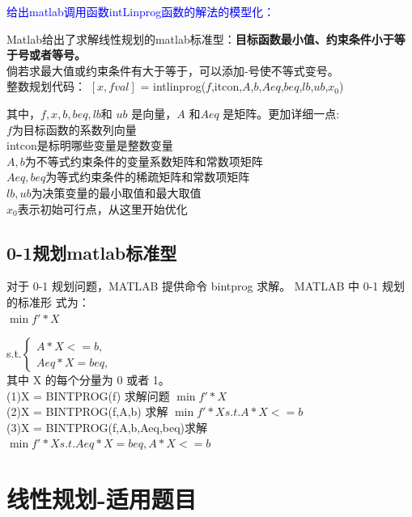 \documentclass[a4paper,20pt]{article}
\begin{document}
\par \noindent \large \textcolor{blue}{给出matlab调用函数intLinprog函数的解法的模型化：}
    \par Matlab给出了求解线性规划的matlab标准型：\textbf{目标函数最小值、约束条件小于等于号或者等号。}\\倘若求最大值或约束条件有大于等于，可以添加-号使不等式变号。
    \\ 整数规划代码： $\left[  x,fval  \right]$ = intlinprog($f$,itcon,$A$,$b$,$Aeq$,$beq$,$lb$,$ub$,$x_0$)
    \par 其中，$f,x,b,beq,lb$和 $ub$ 是向量，$A$ 和$ Aeq$ 是矩阵。更加详细一点:
    \\$f$为目标函数的系数列向量
    \\intcon是标明哪些变量是整数变量
    \\ $A,b$为不等式约束条件的变量系数矩阵和常数项矩阵
    \\$Aeq,beq$为等式约束条件的稀疏矩阵和常数项矩阵
    \\$lb,ub$为决策变量的最小取值和最大取值
    \\$x_0$表示初始可行点，从这里开始优化
    \subsection{0-1规划matlab标准型}
    对于 0-1 规划问题，MATLAB 提供命令 bintprog 求解。 MATLAB 中 0-1 规划的标准形
式为：
\\$\min f'*X$
\par \noindent s.t.$\left\{\begin{matrix}
    A*X <= b,\\
Aeq*X = beq,
\end{matrix} \right.$
\\其中 X 的每个分量为 0 或者 1。
\\(1)X = BINTPROG(f) 求解问题 $\min f'*X$
\\(2)X = BINTPROG(f,A,b) 求解 $\min f'*X s.t. A*X <= b$
\\(3)X = BINTPROG(f,A,b,Aeq,beq)求解 $\min f'*X s.t. Aeq*X = beq, A*X <= b$
\section{线性规划-适用题目}
\end{document}
